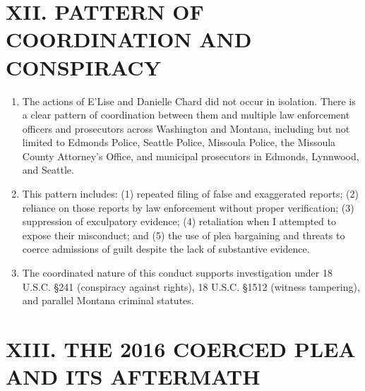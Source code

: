 \documentclass[12pt,letterpaper]{article}
\begin{document}
\section*{XII. PATTERN OF COORDINATION AND CONSPIRACY}

\begin{enumerate}

\item The actions of E'Lise and Danielle Chard did not occur in isolation. There is a clear pattern of coordination between them and multiple law enforcement officers and prosecutors across Washington and Montana, including but not limited to Edmonds Police, Seattle Police, Missoula Police, the Missoula County Attorney's Office, and municipal prosecutors in Edmonds, Lynnwood, and Seattle.

\item This pattern includes: (1) repeated filing of false and exaggerated reports; (2) reliance on those reports by law enforcement without proper verification; (3) suppression of exculpatory evidence; (4) retaliation when I attempted to expose their misconduct; and (5) the use of plea bargaining and threats to coerce admissions of guilt despite the lack of substantive evidence.

\item The coordinated nature of this conduct supports investigation under 18 U.S.C. \S 241 (conspiracy against rights), 18 U.S.C. \S 1512 (witness tampering), and parallel Montana criminal statutes.

\end{enumerate}

\section*{XIII. THE 2016 COERCED PLEA AND ITS AFTERMATH}
\end{document}
